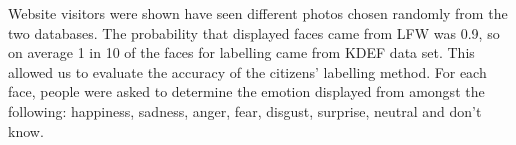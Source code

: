 Website visitors were shown have seen different photos chosen randomly from the two databases. The probability that displayed faces came from LFW was 0.9, so on average 1 in 10 of the faces for labelling came from KDEF data set. This allowed us to evaluate the accuracy of the citizens' labelling method.  
 For each face, people were asked to determine the emotion displayed from amongst the following: happiness, sadness, anger, fear, disgust, surprise, neutral and don't know.
 

